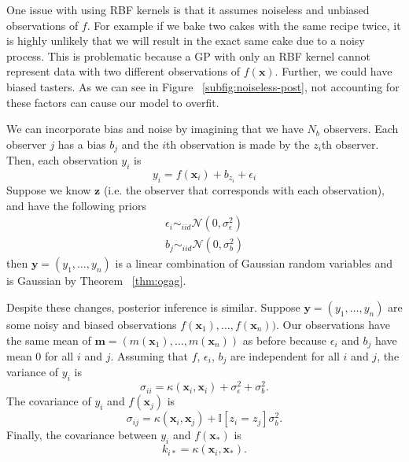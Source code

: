 One issue with using RBF kernels is that it assumes noiseless and unbiased observations of $f$.
For example if we bake two cakes with the same recipe twice, it is highly unlikely that we will result in the exact same cake due to a noisy process.
This is problematic because a GP with only an RBF kernel cannot represent data with two different observations of $f(\mathbf{x})$.
Further, we could have biased tasters.
As we can see in Figure ~\ref{subfig:noiseless-post}, not accounting for these factors can cause our model to overfit.

We can incorporate bias and noise by imagining that we have $N_b$ observers.
Each observer $j$ has a bias $b_j$ and the $i$th observation is made by the $z_i$th observer.
Then, each observation $y_i$ is
\begin{equation*}
    y_i = f(\mathbf{x}_i) + b_{z_i} + \epsilon_i
\end{equation*}
Suppose we know $\mathbf{z}$ (i.e. the observer that corresponds with each observation),
and have the following priors
\begin{align*}
    \epsilon_i \sim_{iid} \mathcal{N}(0, \sigma^2_{\epsilon}) \\
    b_j \sim_{iid} \mathcal{N}(0, \sigma_{b}^2)
\end{align*}
then $\mathbf{y} = (y_1, \ldots, y_n)$ is a linear combination of Gaussian random variables
and is Gaussian by Theorem ~\ref{thm:ogag}.

Despite these changes, posterior inference is similar.
Suppose $\mathbf{y} = (y_1, \ldots, y_n)$ are some noisy and biased observations $f(\mathbf{x}_1), \ldots, f(\mathbf{x}_n))$.
Our observations have the same mean of $\mathbf{m} = (m(\mathbf{x}_1), \ldots, m(\mathbf{x}_n))$ as before because $\epsilon_i$ and $b_j$ have mean 0 for all $i$ and $j$.
Assuming that $f$, $\epsilon_i$, $b_j$ are independent for all $i$ and $j$,
the variance of $y_i$ is
\begin{equation*}
    \sigma_{ii} = \kappa(\mathbf{x}_i, \mathbf{x}_i) + \sigma^2_\epsilon + \sigma^2_b.
\end{equation*}
The covariance of $y_i$ and $f(\mathbf{x}_j)$ is
\begin{equation*}
    \sigma_{ij} = \kappa(\mathbf{x}_i, \mathbf{x}_j) + \mathbb{I}[z_i = z_j] \sigma^2_b.
\end{equation*}
Finally, the covariance between $y_i$ and $f(\mathbf{x}_*)$ is
\begin{equation*}
    k_{i*} = \kappa(\mathbf{x}_i, \mathbf{x}_*).
\end{equation*}

